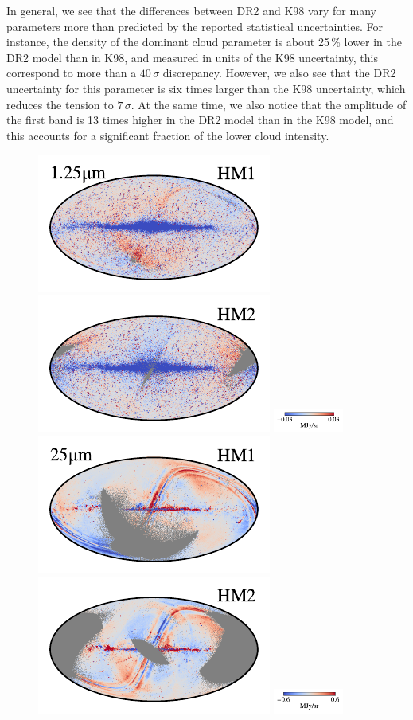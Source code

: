 \documentclass[twocolumn]{aa}
\begin{document}
In general, we see that the differences between DR2 and K98 vary for
many parameters more than predicted by the reported statistical
uncertainties. For instance, the density of the dominant cloud
parameter is about 25\,\% lower in the DR2 model than in K98, and
measured in units of the K98 uncertainty, this correspond to more than
a $40\,\sigma$ discrepancy. However, we also see that the DR2
uncertainty for this parameter is six times larger than the K98
uncertainty, which reduces the tension to $7\,\sigma$. At the same
time, we also notice that the amplitude of the first band is 13 times
higher in the DR2 model than in the K98 model, and this accounts for a
significant fraction of the lower cloud intensity.

\begin{figure}[t]
    \centering
    \includegraphics[width=0.22\linewidth]{figs/compare_zodi_res/cosmoglobe_res_01a.pdf}%
    \includegraphics[width=0.22\linewidth]{figs/compare_zodi_res/cosmoglobe_res_01b.pdf}%
    \includegraphics[width=23mm,angle=90]{figs/compare_zodi_res/cbar_01.pdf}\hspace*{3mm}
    \includegraphics[width=0.22\linewidth]{figs/compare_zodi_res/cosmoglobe_res_06a.pdf}%
    \includegraphics[width=0.22\linewidth]{figs/compare_zodi_res/cosmoglobe_res_06b.pdf}%
    \includegraphics[width=23mm,angle=90]{figs/compare_zodi_res/cbar_06.pdf}\\

\end{figure}
\end{document}
